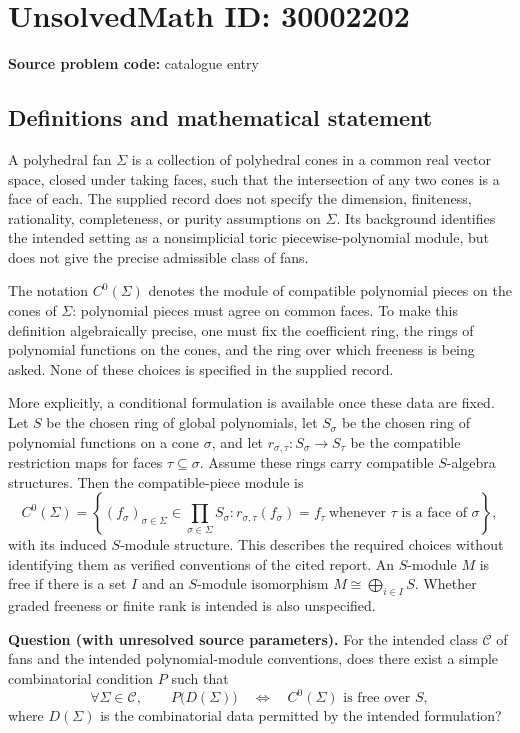 \documentclass[11pt]{article}
\begin{document}
\section*{UnsolvedMath ID: 30002202}
\textbf{Source problem code:} catalogue entry
\subsection{Definitions and mathematical statement}
A polyhedral fan \(\Sigma\) is a collection of polyhedral cones in a common real vector space, closed under taking faces, such that the intersection of any two cones is a face of each. The supplied record does not specify the dimension, finiteness, rationality, completeness, or purity assumptions on \(\Sigma\). Its background identifies the intended setting as a nonsimplicial toric piecewise-polynomial module, but does not give the precise admissible class of fans.

The notation \(C^0(\Sigma)\) denotes the module of compatible polynomial pieces on the cones of \(\Sigma\): polynomial pieces must agree on common faces. To make this definition algebraically precise, one must fix the coefficient ring, the rings of polynomial functions on the cones, and the ring over which freeness is being asked. None of these choices is specified in the supplied record.

More explicitly, a conditional formulation is available once these data are fixed. Let \(S\) be the chosen ring of global polynomials, let \(S_\sigma\) be the chosen ring of polynomial functions on a cone \(\sigma\), and let \(r_{\sigma,\tau}:S_\sigma\to S_\tau\) be the compatible restriction maps for faces \(\tau\subseteq\sigma\). Assume these rings carry compatible \(S\)-algebra structures. Then the compatible-piece module is
\[
C^0(\Sigma)=\left\{(f_\sigma)_{\sigma\in\Sigma}\in\prod_{\sigma\in\Sigma}S_\sigma:
 r_{\sigma,\tau}(f_\sigma)=f_\tau\ \text{whenever }\tau\text{ is a face of }\sigma\right\},
\]
with its induced \(S\)-module structure. This describes the required choices without identifying them as verified conventions of the cited report. An \(S\)-module \(M\) is free if there is a set \(I\) and an \(S\)-module isomorphism \(M\cong\bigoplus_{i\in I}S\). Whether graded freeness or finite rank is intended is also unspecified.

\textbf{Question (with unresolved source parameters).} For the intended class \(\mathcal C\) of fans and the intended polynomial-module conventions, does there exist a simple combinatorial condition \(P\) such that
\[
\forall\Sigma\in\mathcal C,\qquad
P\bigl(D(\Sigma)\bigr)
\quad\Longleftrightarrow\quad
C^0(\Sigma)\text{ is free over }S,
\]
where \(D(\Sigma)\) is the combinatorial data permitted by the intended formulation?
\end{document}
